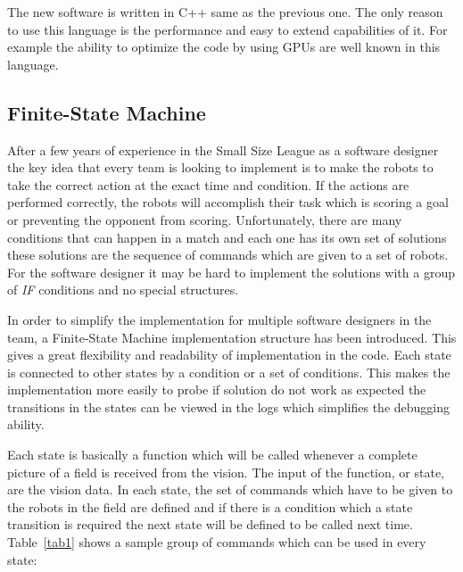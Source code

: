 \documentclass[runningheads]{llncs}
\begin{document}
The new software is written in C++ same as the previous one. The only reason to use this language is the performance and easy to extend capabilities of it. For example the ability to optimize the code by using GPUs are well known in this language.

\subsection{Finite-State Machine} 
After a few years of experience in the Small Size League as a software designer the key idea that every team is looking to implement is to make the robots to take the correct action at the exact time and condition. If the actions are performed correctly, the robots will accomplish their task which is scoring a goal or preventing the opponent from scoring. Unfortunately, there are many conditions that can happen in a match and each one has its own set of solutions these solutions are the sequence of commands which are given to a set of robots. For the software designer it may be hard to implement the solutions with a group of \textit{IF} conditions and no special structures.

In order to simplify the implementation for multiple software designers in the team, a Finite-State Machine implementation structure has been introduced. This gives a great flexibility and readability of implementation in the code. Each state is connected to other states by a condition or a set of conditions. This makes the implementation more easily to probe if solution do not work as expected the transitions in the states can be viewed in the logs which simplifies the debugging ability.

Each state is basically a function which will be called whenever a complete picture of a field is received from the vision. The input of the function, or state, are the vision data.  
In each state, the set of commands which have to be given to the robots in the field are defined and if there is a condition which a state transition is required the next state will be defined to be called next time.
Table~\ref{tab1} shows a sample group of commands which can be used in every state:
\end{document}
